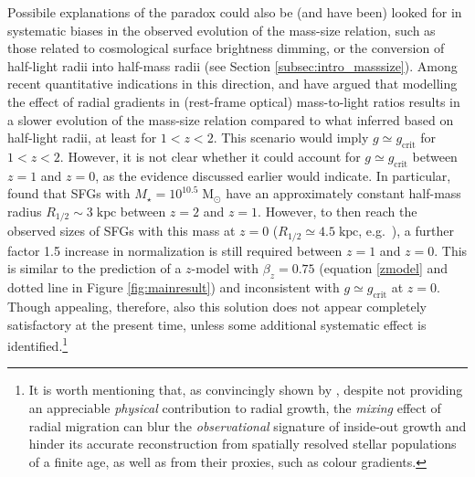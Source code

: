 \documentclass[fleqn,usenatbib]{mnras}
\begin{document}
Possibile explanations of the paradox could also be (and have been) looked for in systematic biases in the observed evolution of the mass-size relation, such as those related to cosmological surface brightness dimming, or the conversion of half-light radii into half-mass radii (see Section \ref{subsec:intro_masssize}). Among recent quantitative indications in this direction, \cite{Suess+19a} and \cite{Mosleh+20} have argued that modelling the effect of radial gradients in (rest-frame optical) mass-to-light ratios results in a slower evolution of the mass-size relation compared to what inferred based on half-light radii, at least for $1 < z < 2$. This scenario would imply $g \simeq g_\textrm{crit}$ for $1 <z < 2$. However, it is not clear whether it could account for  $g \simeq g_\textrm{crit}$ between $z =1$ and $z = 0$, as the evidence discussed earlier would indicate. In particular, \cite{Suess+19b} found that SFGs with $M_\star = 10^{10.5} \; \textrm{M}_\odot$ have an approximately constant half-mass radius $R_{1/2} \sim 3 \; \textrm{kpc}$ between $z=2$ and $z=1$. However, to then reach the observed sizes of SFGs with this mass at $z=0$ ($R_{1/2} \simeq 4.5 \; \textrm{kpc}$, e.g.\ \citealt{Lange+15}), a further factor 1.5 increase in normalization is still required between $z = 1$ and $z = 0$. This is similar to the prediction of a $z$-model with $\beta_z = 0.75$ (equation \ref{zmodel} and dotted line in Figure \ref{fig:mainresult}) and inconsistent with $g \simeq g_\textrm{crit}$ at $z=0$. Though appealing, therefore, also this solution does not appear completely satisfactory at the present time, unless some additional systematic effect is identified.\footnote{It is worth mentioning that, as convincingly shown by \cite{Frankel+19}, despite not providing an appreciable \emph{physical} contribution to radial growth, the \emph{mixing} effect of radial migration can blur the \emph{observational} signature of inside-out growth and hinder its accurate reconstruction from spatially resolved stellar populations of a finite age, as well as from their proxies, such as colour gradients.}
 
\end{document}
